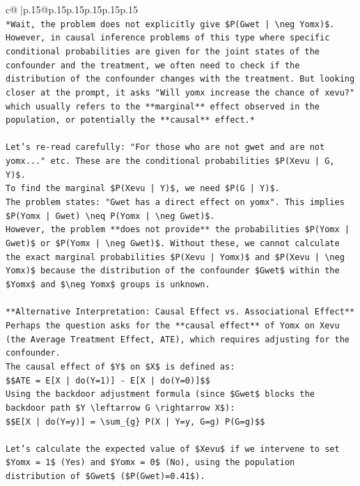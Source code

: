 \documentclass{article}
\begin{document}
{\begin{supertabular}{c@{$\;$}|p{.15\linewidth}@{}p{.15\linewidth}p{.15\linewidth}p{.15\linewidth}p{.15\linewidth}p{.15\linewidth}}
{{{\\ 
\texttt{*Wait, the problem does not explicitly give \$P(Gwet | \textbackslash{}neg Yomx)\$. However, in causal inference problems of this type where specific conditional probabilities are given for the joint states of the confounder and the treatment, we often need to check if the distribution of the confounder changes with the treatment. But looking closer at the prompt, it asks "Will yomx increase the chance of xevu?" which usually refers to the **marginal** effect observed in the population, or potentially the **causal** effect.*} \\
\\ 
\texttt{Let's re{-}read carefully: "For those who are not gwet and are not yomx..." etc. These are the conditional probabilities \$P(Xevu | G, Y)\$.} \\
\texttt{To find the marginal \$P(Xevu | Y)\$, we need \$P(G | Y)\$.} \\
\texttt{The problem states: "Gwet has a direct effect on yomx". This implies \$P(Yomx | Gwet) \textbackslash{}neq P(Yomx | \textbackslash{}neg Gwet)\$.} \\
\texttt{However, the problem **does not provide** the probabilities \$P(Yomx | Gwet)\$ or \$P(Yomx | \textbackslash{}neg Gwet)\$. Without these, we cannot calculate the exact marginal probabilities \$P(Xevu | Yomx)\$ and \$P(Xevu | \textbackslash{}neg Yomx)\$ because the distribution of the confounder \$Gwet\$ within the \$Yomx\$ and \$\textbackslash{}neg Yomx\$ groups is unknown.} \\
\\ 
\texttt{**Alternative Interpretation: Causal Effect vs. Associational Effect**} \\
\texttt{Perhaps the question asks for the **causal effect** of Yomx on Xevu (the Average Treatment Effect, ATE), which requires adjusting for the confounder.} \\
\texttt{The causal effect of \$Y\$ on \$X\$ is defined as:} \\
\texttt{\$\$ATE = E{[}X | do(Y=1){]} {-} E{[}X | do(Y=0){]}\$\$} \\
\texttt{Using the backdoor adjustment formula (since \$Gwet\$ blocks the backdoor path \$Y \textbackslash{}leftarrow G \textbackslash{}rightarrow X\$):} \\
\texttt{\$\$E{[}X | do(Y=y){]} = \textbackslash{}sum\_\{g\} P(X | Y=y, G=g) P(G=g)\$\$} \\
\\ 
\texttt{Let's calculate the expected value of \$Xevu\$ if we intervene to set \$Yomx = 1\$ (Yes) and \$Yomx = 0\$ (No), using the population distribution of \$Gwet\$ (\$P(Gwet)=0.41\$).} \\
}}}
\end{supertabular}}
\end{document}
